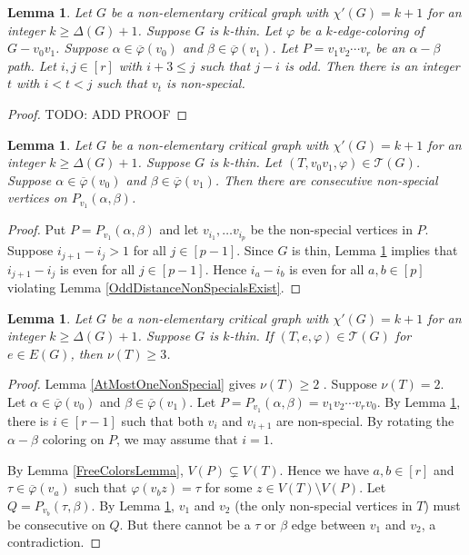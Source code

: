 \documentclass[12pt]{amsart}
\theoremstyle{plain}
\newtheorem{lem}[thm]{Lemma}
\theoremstyle{definition}
\theoremstyle{remark}
\newcommand{\fancy}[1]{\mathcal{#1}}
\newcommand{\T}{\fancy{T}}
\newcommand{\irange}[1]{\left[#1\right]}
\newcommand{\vph}{\varphi}
\newcommand{\vphn}{\overline{\varphi}}
\begin{document}
\begin{lem}\label{HelperOne}
Let $G$ be a non-elementary critical graph with $\chi'(G) = k+1$ for an integer $k \ge \Delta(G) + 1$.  Suppose $G$ is $k$-thin.
Let $\vph$ be a $k$-edge-coloring of $G-v_0v_1$.  Suppose $\alpha \in \vphn(v_0)$ and $\beta \in \vphn(v_1)$.  
Let $P = v_1v_2\cdots v_r$ be an $\alpha-\beta$ path.  Let $i,j \in \irange{r}$ with $i + 3 \le j$ such that $j-i$ is odd.  Then there is an integer $t$ with $i < t < j$ such that $v_t$ is non-special.
\end{lem}
\begin{proof}
TODO: ADD PROOF
\end{proof}

\begin{lem}\label{HelperFour}
Let $G$ be a non-elementary critical graph with $\chi'(G) = k+1$ for an integer $k \ge \Delta(G) + 1$.
Suppose $G$ is $k$-thin. Let $(T, v_0v_1, \vph) \in \T(G)$. Suppose $\alpha \in \vphn(v_0)$ and $\beta \in \vphn(v_1)$.  Then there are consecutive non-special vertices on $P_{v_1}(\alpha, \beta)$.
\end{lem}
\begin{proof}
Put $P = P_{v_1}(\alpha, \beta)$ and let $v_{i_1}, \ldots v_{i_p}$ be the non-special vertices in $P$.
Suppose $i_{j+1} - i_j > 1$ for all $j \in \irange{p-1}$. Since $G$ is thin, Lemma \ref{HelperOne} implies that $i_{j+1} - i_j$ is even for all $j \in \irange{p-1}$.  
Hence $i_a - i_b$ is even for all $a,b \in \irange{p}$ violating Lemma \ref{OddDistanceNonSpecialsExist}.
\end{proof}

\begin{lem}\label{HelperFive}
Let $G$ be a non-elementary critical graph with $\chi'(G) = k+1$ for an integer $k \ge \Delta(G) + 1$.
Suppose $G$ is $k$-thin. If $(T, e, \vph) \in \T(G)$ for $e \in E(G)$, then $\nu(T) \ge 3$.
\end{lem}
\begin{proof}
Lemma \ref{AtMostOneNonSpecial} gives $\nu(T) \ge 2$ .  Suppose $\nu(T) = 2$.  
Let $\alpha \in \vphn(v_0)$ and $\beta \in \vphn(v_1)$.  Let $P = P_{v_1}(\alpha, \beta) = v_1v_2\cdots v_rv_0$.
By Lemma \ref{HelperFour}, there is $i \in \irange{r-1}$ such that both $v_i$ and $v_{i+1}$ are non-special.  By rotating the $\alpha-\beta$ coloring on $P$, we may assume that $i=1$.

By Lemma \ref{FreeColorsLemma}, $V(P) \subsetneq V(T)$. Hence we have $a,b \in \irange{r}$ and $\tau \in \vphn(v_a)$ such that $\vph(v_bz) = \tau$ for some $z \in V(T) \setminus V(P)$.  
Let $Q = P_{v_b}(\tau, \beta)$. By Lemma \ref{HelperFour}, $v_1$ and $v_2$ (the only non-special vertices in $T$) must be consecutive on $Q$.  
But there cannot be a $\tau$ or $\beta$ edge between $v_1$ and $v_2$, a contradiction.
\end{proof}
\end{document}
